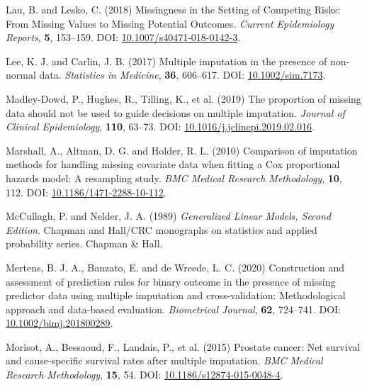 \documentclass[
  letterpaper,
  DIV=11,
  numbers=noendperiod]{scrreprt}
\newlength{\cslhangindent}
\newlength{\cslentryspacingunit} %
\newenvironment{CSLReferences}[2] %
 {%
  \setlength{\parindent}{0pt}
  \ifodd #1
  \let\oldpar\par
  \def\par{\hangindent=\cslhangindent\oldpar}
  \fi
  \setlength{\parskip}{#2\cslentryspacingunit}
 }%
 {}
\begin{document}
\begin{CSLReferences}{1}{0}
\leavevmode{}%
Lau, B. and Lesko, C. (2018) Missingness in the {Setting} of {Competing
Risks}: From {Missing Values} to {Missing Potential Outcomes}.
\emph{Current Epidemiology Reports}, \textbf{5}, 153--159. DOI:
\href{https://doi.org/10.1007/s40471-018-0142-3}{10.1007/s40471-018-0142-3}.

\leavevmode{}%
Lee, K. J. and Carlin, J. B. (2017) Multiple imputation in the presence
of non-normal data. \emph{Statistics in Medicine}, \textbf{36},
606--617. DOI:
\href{https://doi.org/10.1002/sim.7173}{10.1002/sim.7173}.

\leavevmode{}%
Madley-Dowd, P., Hughes, R., Tilling, K., et al. (2019) The proportion
of missing data should not be used to guide decisions on multiple
imputation. \emph{Journal of Clinical Epidemiology}, \textbf{110},
63--73. DOI:
\href{https://doi.org/10.1016/j.jclinepi.2019.02.016}{10.1016/j.jclinepi.2019.02.016}.

\leavevmode{}%
Marshall, A., Altman, D. G. and Holder, R. L. (2010) Comparison of
imputation methods for handling missing covariate data when fitting a
{Cox} proportional hazards model: A resampling study. \emph{BMC Medical
Research Methodology}, \textbf{10}, 112. DOI:
\href{https://doi.org/10.1186/1471-2288-10-112}{10.1186/1471-2288-10-112}.

\leavevmode{}%
McCullagh, P. and Nelder, J. A. (1989) \emph{Generalized Linear Models,
Second Edition}. Chapman and {Hall}/{CRC} monographs on statistics and
applied probability series. Chapman \& Hall.

\leavevmode{}%
Mertens, B. J. A., Banzato, E. and de Wreede, L. C. (2020) Construction
and assessment of prediction rules for binary outcome in the presence of
missing predictor data using multiple imputation and cross-validation:
{Methodological} approach and data-based evaluation. \emph{Biometrical
Journal}, \textbf{62}, 724--741. DOI:
\href{https://doi.org/10.1002/bimj.201800289}{10.1002/bimj.201800289}.

\leavevmode{}%
Morisot, A., Bessaoud, F., Landais, P., et al. (2015) Prostate cancer:
Net survival and cause-specific survival rates after multiple
imputation. \emph{BMC Medical Research Methodology}, \textbf{15}, 54.
DOI:
\href{https://doi.org/10.1186/s12874-015-0048-4}{10.1186/s12874-015-0048-4}.


\end{CSLReferences}
\end{document}
